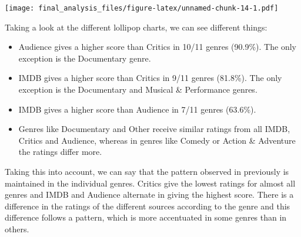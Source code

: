 \documentclass[]{article}
\providecommand{\tightlist}{%
  \setlength{\itemsep}{0pt}\setlength{\parskip}{0pt}}
\begin{document}
\texttt{[image: final\_analysis\_files/figure-latex/unnamed-chunk-14-1.pdf]}

Taking a look at the different lollipop charts, we can see different
things:

\begin{itemize}
\tightlist
\item
  Audience gives a higher score than Critics in 10/11 genres (90.9\%).
  The only exception is the Documentary genre.
\item
  IMDB gives a higher score than Critics in 9/11 genres (81.8\%). The
  only exception is the Documentary and Musical \& Performance genres.
\item
  IMDB gives a higher score than Audience in 7/11 genres (63.6\%).
\item
  Genres like Documentary and Other receive similar ratings from all
  IMDB, Critics and Audience, whereas in genres like Comedy or Action \&
  Adventure the ratings differ more.
\end{itemize}

Taking this into account, we can say that the pattern observed in
previously is maintained in the individual genres. Critics give the
lowest ratings for almost all genres and IMDB and Audience alternate in
giving the highest score. There is a difference in the ratings of the
different sources according to the genre and this difference follows a
pattern, which is more accentuated in some genres than in others.
\end{document}
